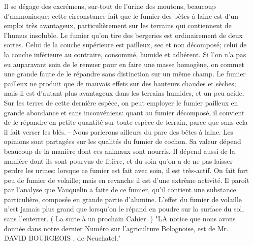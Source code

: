 Il se dégage des excrémens, sur-tout de l'urine des moutons, beaucoup d'ammoniaque; cette circonstance fait que le fumier des bêtes à laine est d'un emploi très avantageux, particulièrement sur les terrains qui contiennent de l'humus insoluble.
Le fumier qu'on tire des bergeries est ordinairement de deux sortes. Celui de la couche supérieure est pailleux, sec et non décomposé; celui de la couche inférieure au contraire, consommé, humide et adhérent. Si l'on n'a pas eu auparavant soin de le remuer pour en faire une masse homogène, on commet une grande faute de le répandre sans distinction sur un même champ. Le fumier pailleux ne produit que de mauvais effets sur des hauteurs chaudes et sèches; mais il est d'autant plus avantageux dans les terrains humides, et un peu acide. Sur les terres de cette dernière espèce, on peut employer le fumier pailleux en grande abondance et sans inconvéniens: quant au fumier décomposé, il convient de le répandre en petite quantité sur toute espèce de terrain, parce que sans cela il fait verser les blés.\setcounter{page}{240} - Nous parlerons ailleurs du parc des bêtes à laine.
Les opinions sont partagées sur les qualités du fumier de cochon. Sa valeur dépend beaucoup de la manière dont ces animaux sont nourris. Il dépend aussi de la manière dont ils sont pourvus de litière, et du soin qu'on a de ne pas laisser perdre les urines: lorsque ce fumier est fait avec soin, il est très-actif.
On fait fort peu de fumier de volaille; mais en revanche il est d'une extrême activité. Il paroît par l'analyse que Vauquelin a faite de ce fumier, qu'il contient une substance particulière, composée en grande partie d'alumine. L'effet du fumier de volaille n'est jamais plus grand que lorsqu'on le répand en poudre sur la surface du sol, sans l'enterrer.
( La suite à un prochain Cahier. )
"LA notice que nous avons donnée dans notre dernier Numéro sur l'agriculture Bolognoise, est de Mr. DAVID BOURGEOIS , de Neuchatel."